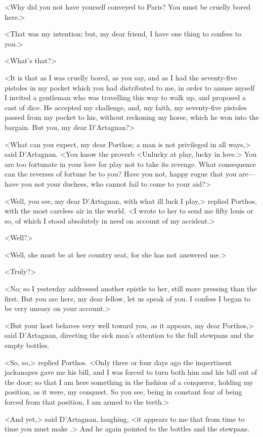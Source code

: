 <Why did you not have yourself conveyed to Paris? You must be cruelly bored here.> 

<That was my intention; but, my dear friend, I have one thing to confess to you.> 

<What's that?> 

<It is that as I was cruelly bored, as you say, and as I had the seventy-five pistoles in my pocket which you had distributed to me, in order to amuse myself I invited a gentleman who was travelling this way to walk up, and proposed a cast of dice. He accepted my challenge, and, my faith, my seventy-five pistoles passed from my pocket to his, without reckoning my horse, which he won into the bargain. But you, my dear D'Artagnan?> 

<What can you expect, my dear Porthos; a man is not privileged in all ways,> said D'Artagnan. <You know the proverb <Unlucky at play, lucky in love.> You are too fortunate in your love for play not to take its revenge. What consequence can the reverses of fortune be to you? Have you not, happy rogue that you are—have you not your duchess, who cannot fail to come to your aid?> 

<Well, you see, my dear D'Artagnan, with what ill luck I play,> replied Porthos, with the most careless air in the world. <I wrote to her to send me fifty louis or so, of which I stood absolutely in need on account of my accident.> 

<Well?> 

<Well, she must be at her country seat, for she has not answered me.> 

<Truly?> 

<No; so I yesterday addressed another epistle to her, still more pressing than the first. But you are here, my dear fellow, let us speak of you. I confess I began to be very uneasy on your account.> 

<But your host behaves very well toward you, as it appears, my dear Porthos,> said D'Artagnan, directing the sick man's attention to the full stewpans and the empty bottles. 

<So, so,> replied Porthos. <Only three or four days ago the impertinent jackanapes gave me his bill, and I was forced to turn both him and his bill out of the door; so that I am here something in the fashion of a conqueror, holding my position, as it were, my conquest. So you see, being in constant fear of being forced from that position, I am armed to the teeth.> 

<And yet,> said D'Artagnan, laughing, <it appears to me that from time to time you must make .> And he again pointed to the bottles and the stewpans. 

